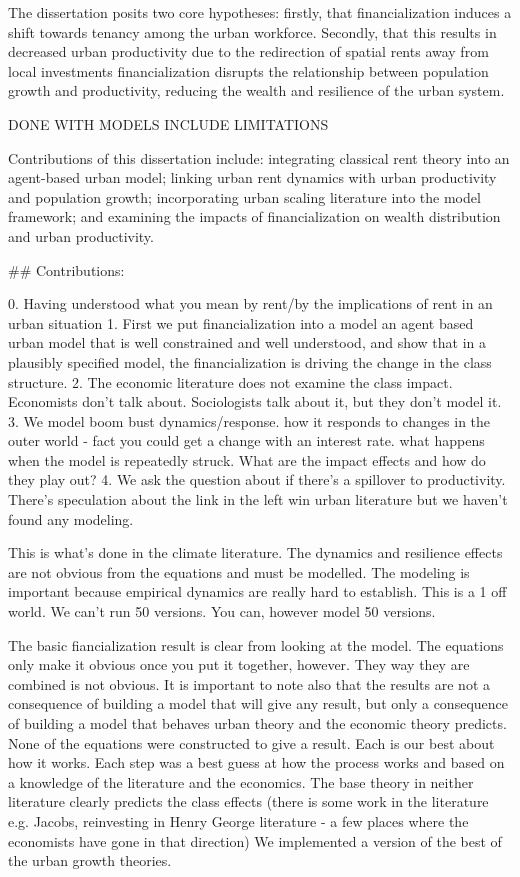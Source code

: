 The dissertation posits two core hypotheses: firstly, that financialization induces a shift towards tenancy among the urban workforce. Secondly, that this results in decreased urban productivity due to the redirection of spatial rents away from local investments financialization disrupts the relationship between population growth and productivity, reducing the wealth and resilience of the urban system.

DONE WITH MODELS INCLUDE LIMITATIONS

Contributions of this dissertation include: integrating classical rent theory into an agent-based urban model; linking urban rent dynamics with urban productivity and population growth; incorporating urban scaling literature into the model framework; and examining the impacts of financialization on wealth distribution and urban productivity.


## Contributions:

0. Having understood what you mean by rent/by the implications of rent in an urban situation
1. First we put financialization into a model an agent based urban model that is well constrained and well understood, and show that in a plausibly specified model, the financialization is driving the change in the class structure. 
2. The economic literature does not examine the class impact. Economists don't talk about. Sociologists talk about it, but they don't model it.
3. We model boom bust dynamics/response. how it responds to changes in the outer world - fact you could get a change with an interest rate. what happens when the model is repeatedly struck. What are the impact effects and how do they play out?
4.  We ask the question about if there's a spillover to productivity. There's speculation about the link in the left win urban literature but we haven't found any modeling.

This is what's done in the climate literature. The dynamics and resilience effects are not obvious from the equations and must be modelled. The modeling is important because empirical dynamics are really hard to establish. This is a 1 off world. We can't run 50 versions. You can, however model 50 versions. 

The basic fiancialization result is clear from looking at the model. The equations only make it obvious once you put it together, however. They way they are combined is not obvious.  It is important to note also that the results are not a consequence of building a model that will give any result, but only a consequence of building a model that behaves urban theory and the economic theory predicts. None of the equations were constructed to give a result. Each is our best about how it works. Each step was a best guess at how the process works and based on a knowledge of the literature and the economics. The base theory in neither literature clearly predicts the class effects (there is some work in the literature e.g. Jacobs, reinvesting in Henry George literature - a few places where the economists have gone in that direction) We implemented a version of the best of the urban growth theories.


